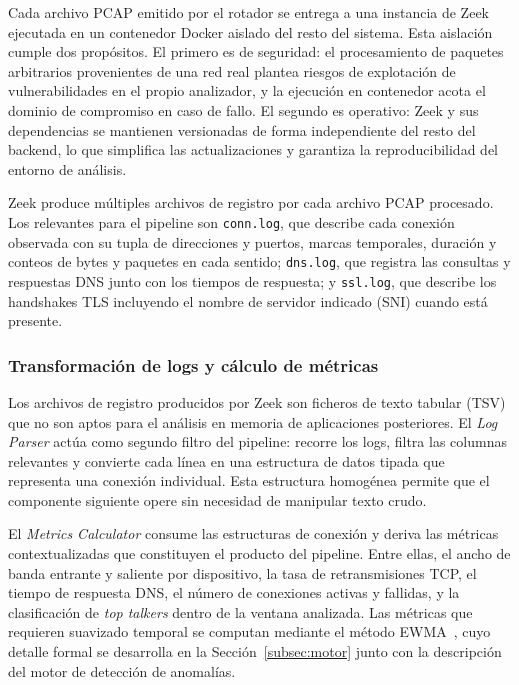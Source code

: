 Cada archivo PCAP emitido por el rotador se entrega a una instancia 
de Zeek ejecutada en un contenedor Docker aislado del resto del 
sistema. Esta aislación cumple dos propósitos. El primero es de 
seguridad: el procesamiento de paquetes arbitrarios provenientes 
de una red real plantea riesgos de explotación de vulnerabilidades 
en el propio analizador, y la ejecución en contenedor acota el 
dominio de compromiso en caso de fallo. El segundo es operativo: 
Zeek y sus dependencias se mantienen versionadas de forma 
independiente del resto del backend, lo que simplifica las 
actualizaciones y garantiza la reproducibilidad del entorno de 
análisis.

Zeek produce múltiples archivos de registro por cada archivo PCAP 
procesado. Los relevantes para el pipeline son \texttt{conn.log}, 
que describe cada conexión observada con su 
tupla de direcciones y puertos, marcas temporales, duración y 
conteos de bytes y paquetes en cada sentido; \texttt{dns.log}, que 
registra las consultas y respuestas DNS junto con los tiempos de 
respuesta; y \texttt{ssl.log}, que describe los handshakes TLS 
incluyendo el nombre de servidor indicado (SNI) cuando está 
presente.

\subsubsection{Transformación de logs y cálculo de métricas}

Los archivos de registro producidos por Zeek son ficheros de texto 
tabular (TSV) que no son aptos para el análisis en memoria de 
aplicaciones posteriores. El \textit{Log Parser} actúa como 
segundo filtro del pipeline: recorre los logs, filtra las columnas 
relevantes y convierte cada línea en una estructura de datos 
tipada que representa una conexión individual. Esta estructura 
homogénea permite que el componente siguiente opere sin necesidad 
de manipular texto crudo.

El \textit{Metrics Calculator} consume las estructuras de conexión 
y deriva las métricas contextualizadas que constituyen el producto 
del pipeline. Entre ellas, el ancho de banda entrante y saliente 
por dispositivo, la tasa de retransmisiones TCP, el tiempo de 
respuesta DNS, el número de conexiones activas y fallidas, y la 
clasificación de \textit{top talkers} dentro de la ventana 
analizada. Las métricas que requieren suavizado temporal se 
computan mediante el método EWMA~\cite{lucas1990ewma,roberts1959ewma}, 
cuyo detalle formal se desarrolla en la Sección~\ref{subsec:motor} 
junto con la descripción del motor de detección de anomalías.

